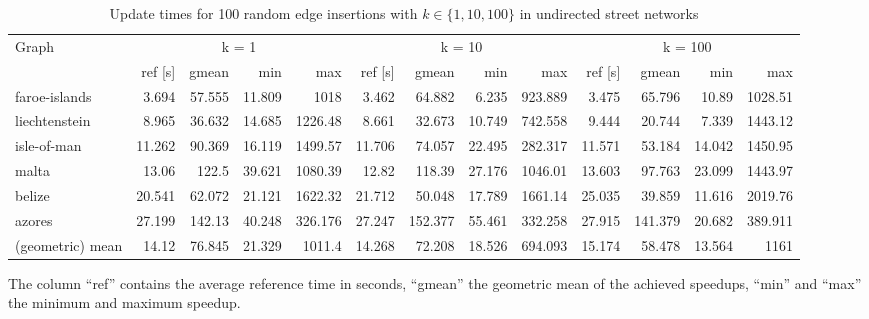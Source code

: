 \begin{landscape}

\begin{table}[h!]
\centering
\begin{tabular}{l|rrrr|rrrr|rrrr}
\toprule
Graph & \multicolumn{4}{c|}{k = 1} & \multicolumn{4}{c|}{k = 10} & \multicolumn{4}{c}{k = 100}\\
                &     ref [s] &   gmean &   min &     max &     ref [s] &   gmean &   min &     max &     ref [s] &   gmean &   min &     max \\
\midrule \midrule
 faroe-islands    &  3.694 &  57.555 & 11.809 & 1018     &  3.462 &  64.882 &  6.235 &  923.889 &  3.475 &  65.796 & 10.89  & 1028.51  \\
 liechtenstein    &  8.965 &  36.632 & 14.685 & 1226.48  &  8.661 &  32.673 & 10.749 &  742.558 &  9.444 &  20.744 &  7.339 & 1443.12  \\
 isle-of-man      & 11.262 &  90.369 & 16.119 & 1499.57  & 11.706 &  74.057 & 22.495 &  282.317 & 11.571 &  53.184 & 14.042 & 1450.95  \\
 malta            & 13.06  & 122.5   & 39.621 & 1080.39  & 12.82  & 118.39  & 27.176 & 1046.01  & 13.603 &  97.763 & 23.099 & 1443.97  \\
 belize           & 20.541 &  62.072 & 21.121 & 1622.32  & 21.712 &  50.048 & 17.789 & 1661.14  & 25.035 &  39.859 & 11.616 & 2019.76  \\
 azores           & 27.199 & 142.13  & 40.248 &  326.176 & 27.247 & 152.377 & 55.461 &  332.258 & 27.915 & 141.379 & 20.682 &  389.911 \\ \midrule \midrule
 (geometric) mean & 14.12  &  76.845 & 21.329 & 1011.4   & 14.268 &  72.208 & 18.526 &  694.093 & 15.174 &  58.478 & 13.564 & 1161     \\
\bottomrule
\end{tabular}
\caption{Update times for 100 random edge insertions with  $k \in \{1, 10, 100\}$ in undirected street networks}{The column ``ref'' contains the average reference time in seconds, ``gmean'' the geometric mean of the achieved speedups, ``min'' and ``max'' the minimum and maximum speedup.}
\label{tbl:resultsStreetNetworksUndirected}
\end{table}


\end{landscape}
